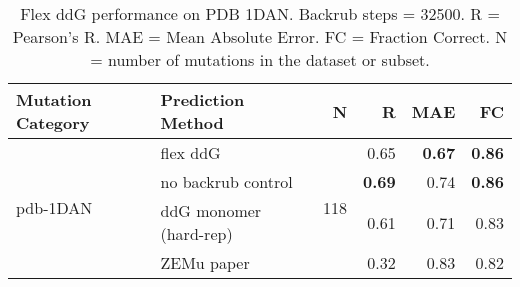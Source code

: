 \begin{table}
  \begin{tabular}{llrrrr}
\toprule
Mutation Category &       Prediction Method &    N &    R &  MAE &   FC \\
\midrule
 \multirow{ 4}{*}{pdb-1DAN} & flex ddG & \multirow{ 4}{*}{118} & 0.65 & \textbf{0.67} & \textbf{0.86}  \\
 & no backrub control & & \textbf{0.69} & 0.74 & \textbf{0.86}  \\
 & ddG monomer (hard-rep) & & 0.61 & 0.71 & 0.83  \\
 & ZEMu paper & & 0.32 & 0.83 & 0.82  \\
\bottomrule
\end{tabular}
  \caption[Flex ddG performance on PDB 1DAN]{
    Flex ddG performance on PDB 1DAN. Backrub steps = 32500. R = Pearson's R. MAE = Mean Absolute Error. FC = Fraction Correct. N = number of mutations in the dataset or subset.
  } \label{tab:table-pdb-1DAN}
\end{table}
